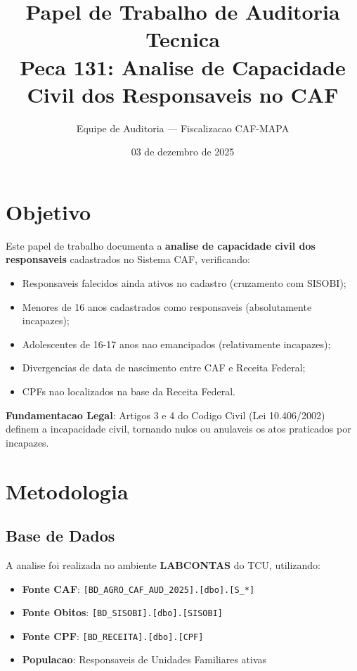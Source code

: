 \documentclass[11pt,a4paper]{article}
\title{Papel de Trabalho de Auditoria Tecnica\\
\textbf{Peca 131: Analise de Capacidade Civil dos Responsaveis no CAF}}
\author{Equipe de Auditoria --- Fiscalizacao CAF-MAPA}
\date{03 de dezembro de 2025}
\begin{document}
\maketitle

\section{Objetivo}

Este papel de trabalho documenta a \textbf{analise de capacidade civil dos responsaveis}
cadastrados no Sistema CAF, verificando:

\begin{itemize}
    \item Responsaveis falecidos ainda ativos no cadastro (cruzamento com SISOBI);
    \item Menores de 16 anos cadastrados como responsaveis (absolutamente incapazes);
    \item Adolescentes de 16-17 anos nao emancipados (relativamente incapazes);
    \item Divergencias de data de nascimento entre CAF e Receita Federal;
    \item CPFs nao localizados na base da Receita Federal.
\end{itemize}

\textbf{Fundamentacao Legal}: Artigos 3\textordmasculine{} e 4\textordmasculine{} do Codigo Civil
(Lei 10.406/2002) definem a incapacidade civil, tornando nulos ou anulaveis os atos
praticados por incapazes.

\section{Metodologia}

\subsection{Base de Dados}

A analise foi realizada no ambiente \textbf{LABCONTAS} do TCU, utilizando:

\begin{itemize}
    \item \textbf{Fonte CAF}: \texttt{[BD\_AGRO\_CAF\_AUD\_2025].[dbo].[S\_*]}
    \item \textbf{Fonte Obitos}: \texttt{[BD\_SISOBI].[dbo].[SISOBI]}
    \item \textbf{Fonte CPF}: \texttt{[BD\_RECEITA].[dbo].[CPF]}
    \item \textbf{Populacao}: Responsaveis de Unidades Familiares ativas
\end{itemize}
\end{document}
